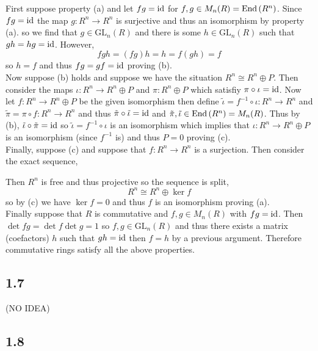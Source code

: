 \documentclass[12pt]{extarticle}
\renewcommand{\GL}{\mathrm{GL}}
\begin{document}
First suppose property (a) and let $f g = \mathrm{id}$ for $f, g \in M_n(R) = \text{End}\left( R^n \right)$. Since $f g = \mathrm{id}$ the map $g : R^n \to R^n$ is surjective and thus an isomorphism by property (a). so we find that $g \in \GL_n(R)$ and there is some $h \in \GL_n(R)$ such that $g h = hg = \mathrm{id}$. However,
\[ f g h = (fg)h = h = f (gh) = f \]
so $h = f$ and thus $fg = gf = \mathrm{id}$ proving (b).
\bigskip\\
Now suppose (b) holds and suppose we have the situation $R^n \cong R^n \oplus P$. Then consider the maps $\iota : R^n \to R^n \oplus P$ and $\pi : R^n \oplus P$ which satisfiy $\pi \circ \iota = \mathrm{id}$. Now let $f : R^n \to R^n \oplus P$ be the given isomorphism then define $\tilde{\iota} = f^{-1} \circ \iota : R^n \to R^n$ and $\tilde{\pi} = \pi \circ f : R^n \to R^n$ and thus $\tilde{\pi} \circ \tilde{\iota} = \mathrm{id}$ and $\tilde{\pi}, \tilde{\iota} \in \text{End}\left( R^n \right) = M_n(R)$.
Thus by (b), $\tilde{\iota} \circ \tilde{\pi} = \mathrm{id}$ so $\tilde{\iota} = f^{-1} \circ \iota$ is an isomorphism which implies that $\iota : R^n \to R^n \oplus P$ is an isomorphism (since $f^{-1}$ is) and thus $P = 0$ proving (c).
\bigskip\\
Finally, suppose (c) and suppose that $f : R^n \to R^n$ is a surjection. Then consider the exact sequence,
\begin{center}
\end{center}
Then $R^n$ is free and thus projective so the sequence is split,
\[ R^n \cong R^n \oplus \ker{f} \]
so by (c) we have $\ker{f} = 0$ and thus $f$ is an isomorphism proving (a).
\bigskip\\
Finally suppose that $R$ is commutative and $f,g \in M_n(R)$ with $fg = \mathrm{id}$. Then $\det{fg} = \det{f} \det{g} = 1$ so $f,g \in \GL_n(R)$ and thus there exists a matrix (coefactors) $h$ such that $gh = \mathrm{id}$ then $f = h$ by a previous argument. Therefore commutative rings satisfy all the above properties. 

\subsection{1.7}

(NO IDEA)

\subsection{1.8}
\end{document}
